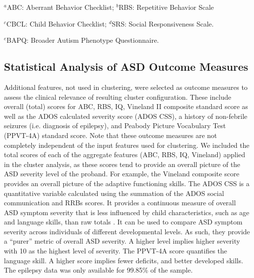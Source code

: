 \documentclass{bmcart}
\begin{document}
\begin{table}
\begin{tabular}{p{3.8cm}p{7.5cm}}
\end{tabular}
\begin{tablenotes}\footnotesize
\item $^a$ABC: Aberrant Behavior Checklist; $^b$RBS: Repetitive Behavior Scale
\item $^c$CBCL: Child Behavior Checklist; $^d$SRS: Social Responsiveness Scale.
\item $^e$BAPQ: Broader Autism Phenotype Questionnaire.

\end{tablenotes}
\end{table}

\subsection*{Statistical Analysis of ASD Outcome Measures }
Additional features, not used in clustering, were selected as outcome measures to assess the clinical relevance of resulting cluster configuration. These include overall (total) scores for ABC, RBS, IQ, Vineland II composite standard score as well as the ADOS calculated severity score (ADOS CSS), a history of non-febrile seizures (i.e. diagnosis of epilepsy), and Peabody Picture Vocabulary Test (PPVT-4A) standard score. 
Note that these outcome measures are not completely independent of the input features used for clustering.  We included the total scores of each of the aggregate features (ABC, RBS, IQ, Vineland) applied in the cluster analysis, as these scores tend to provide an overall picture of the ASD severity level of the proband. For example, the Vineland composite score provides an overall picture of the adaptive functioning skills. 
The ADOS CSS is a quantitative variable calculated using the summation of the ADOS social communication
and RRBs scores. It provides a continuous measure of overall ASD symptom severity that is less influenced by child characteristics, such as age and language skills, than raw totals \cite{hus2014standardizing}. 
It can be used to compare ASD symptom severity across individuals of different developmental levels. As such, they provide a “purer” metric of overall ASD severity. A higher level implies higher severity with 10 as the highest level of severity. 
The PPVT-4A score quantifies the language skill. A higher score implies fewer deficits, and better developed skills.
The epilepsy data was only available for 99.85\% of the sample.
\end{document}
